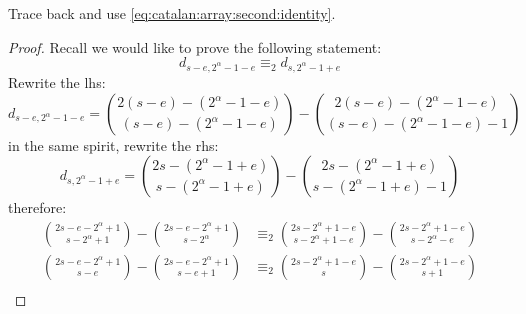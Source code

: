 Trace back and use \autoref{eq:catalan:array:second:identity}. 
\begin{proof}
Recall we would like to prove the following statement:
\begin{displaymath}
    d_{s-e,2^{{\alpha}}-1-e} \equiv_{2} d_{s,2^{{\alpha}}-1+e}
\end{displaymath}
Rewrite the \ac{lhs}:
\begin{displaymath}
    d_{s-e,2^{{\alpha}}-1-e}= {{2(s-e)-(2^{{\alpha}}-1-e)}\choose{(s-e)-(2^{{\alpha}}-1-e)}}
        - {{2(s-e)-(2^{{\alpha}}-1-e)}\choose{(s-e)-(2^{{\alpha}}-1-e)-1}}
\end{displaymath}
in the same spirit, rewrite the \ac{rhs}:
\begin{displaymath}
    d_{s,2^{{\alpha}}-1+e}={{2s-(2^{{\alpha}}-1+e)}\choose{s-(2^{{\alpha}}-1+e)}}
        - {{2s-(2^{{\alpha}}-1+e)}\choose{s-(2^{{\alpha}}-1+e)-1}}
\end{displaymath}
therefore:
\begin{displaymath}
    \begin{split}
        {{2s-e-2^{{\alpha}}+1}\choose{s-2^{{\alpha}}+1}}
            - {{2s-e-2^{{\alpha}}+1}\choose{s-2^{{\alpha}}}}
        &\equiv_{2}
        {{2s-2^{{\alpha}}+1-e}\choose{s-2^{{\alpha}}+1-e}}
            - {{2s-2^{{\alpha}}+1-e}\choose{s-2^{{\alpha}}-e}}\\
        {{2s-e-2^{{\alpha}}+1}\choose{s-e}}
            - {{2s-e-2^{{\alpha}}+1}\choose{s-e+1}}
        &\equiv_{2}
        {{2s-2^{{\alpha}}+1-e}\choose{s}}
            - {{2s-2^{{\alpha}}+1-e}\choose{s+1}}\\
    \end{split}
\end{displaymath}


\end{proof}
